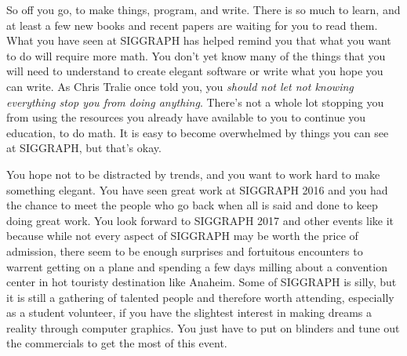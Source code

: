 \documentclass[../main.tex]{subfiles}
\begin{document}
So off you go, to make things, program, and write. There is so much to learn, and at least a few new books and recent papers are waiting for you to read them. What you have seen at SIGGRAPH has helped remind you that what you want to do will require more math. You don't yet know many of the things that you will need to understand to create elegant software or write what you hope you can write. As Chris Tralie once told you, you \textit{should not let not knowing everything stop you from doing anything}. There's not a whole lot stopping you from using the resources you already have available to you to continue you education, to do math. It is easy to become overwhelmed by things you can see at SIGGRAPH, but that's okay.

You hope not to be distracted by trends, and you want to work hard to make something elegant. You have seen great work at SIGGRAPH 2016 and you had the chance to meet the people who go back when all is said and done to keep doing great work. You look forward to SIGGRAPH 2017 and other events like it because while not every aspect of SIGGRAPH may be worth the price of admission, there seem to be enough surprises and fortuitous encounters to warrent getting on a plane and spending a few days milling about a convention center in hot touristy destination like Anaheim. Some of SIGGRAPH is silly, but it is still a gathering of talented people and therefore worth attending, especially as a student volunteer, if you have the slightest interest in making dreams a reality through computer graphics. You just have to put on blinders and tune out the commercials to get the most of this event.
\end{document}
